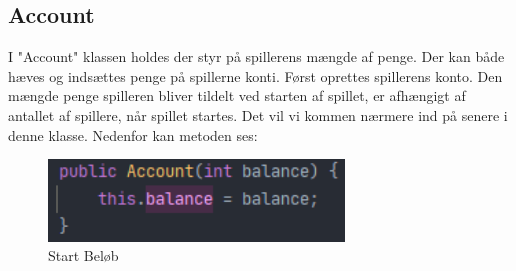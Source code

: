 \subsection{Account}
I "Account" klassen holdes der styr på spillerens mængde af penge. Der kan både hæves og indsættes penge på spillerne konti. Først oprettes spillerens konto. Den mængde penge spilleren bliver tildelt ved starten af spillet, er afhængigt af antallet af spillere, når spillet startes. Det vil vi kommen nærmere ind på senere i denne klasse. Nedenfor kan metoden ses:
\begin{figure}[H]
    \centering
    \includegraphics[width=0.7\textwidth]{sources/7_implementering/Account.PNG}
    \caption{Start Beløb}
    \label{fig:chance}
\end{figure}

